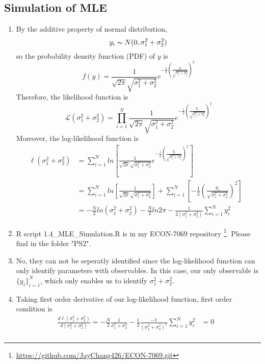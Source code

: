 \documentclass[12pt]{article}
\begin{document}
\subsection{Simulation of MLE} \label{MLE}
\begin{enumerate}
      \item By the additive property of normal distribution, $$y_i\thicksim N(0, \sigma^2_1 + \sigma^2_2)$$
            so the probability density function (PDF) of $y$ is $$f(y) = \frac{1}{\sqrt{2 \pi} \sqrt{\sigma^2_1 + \sigma^2_2}} e^{- \frac{1}{2} (\frac{y}{\sqrt{\sigma^2_1 + \sigma^2_2}})^2}$$
            Therefore, the likelihood function is $$\mathcal{L}(\sigma^2_1 + \sigma^2_2) = \prod_{i = 1}^{N} \frac{1}{\sqrt{2 \pi} \sqrt{\sigma^2_1 + \sigma^2_2}} e^{- \frac{1}{2} (\frac{y_i}{\sqrt{\sigma^2_1 + \sigma^2_2}})^2}$$
            Moreover, the log-likelihood function is 
            \begin{align}
                  \boldsymbol \ell(\sigma^2_1 + \sigma^2_2) & = \sum_{i = 1}^{N} ln[\frac{1}{\sqrt{2 \pi} \sqrt{\sigma^2_1 + \sigma^2_2}} e^{- \frac{1}{2} (\frac{y_i}{\sqrt{\sigma^2_1 + \sigma^2_2}})^2}] & \nonumber \\ 
                                                            & = \sum_{i = 1}^{N} ln[\frac{1}{\sqrt{2 \pi} \sqrt{\sigma^2_1 + \sigma^2_2}}] + \sum_{i = 1}^{N} [- \frac{1}{2} (\frac{y_i}{\sqrt{\sigma^2_1 + \sigma^2_2}})^2] & \nonumber \\ 
                                                            & = -\frac{N}{2} ln(\sigma^2_1 + \sigma^2_2) -\frac{N}{2} ln2\pi - \frac{1}{2(\sigma^2_1 + \sigma^2_2)} \sum_{i = 1}^{N}y_i^2 & \nonumber
            \end{align}
      \item R script 1.4\_MLE\_Simulation.R is in my ECON-7069 repository \footnote{\url{https://github.com/JayChang426/ECON-7069.git}}.
            Please find in the folder "PS2".
      \item No, they can not be seperatly identified since the log-likelihood function can only identify parameters with observables. 
            In this case, our only observable is $\{y_i\}^N_{i = 1}$, which only enables us to identify $\sigma^2_1 + \sigma^2_2$.
      \item Taking first order derivative of our log-likelihood function, first order condition is
            \begin{align}
                  \frac{d \boldsymbol \ell(\sigma^2_1 + \sigma^2_2)}{d (\sigma^2_1 + \sigma^2_2)} = -\frac{N}{2} \frac{1}{\sigma^2_1 + \sigma^2_2} - \frac{1}{2} \frac{-1}{(\sigma^2_1 + \sigma^2_2)^2} \sum_{i = 1}^{N}y_i^2 & = 0 & \nonumber \\ 

\end{align}
\end{enumerate}
\end{document}
